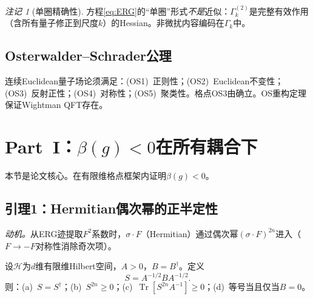 \documentclass[12pt,a4paper]{article}
\theoremstyle{plain}
\theoremstyle{definition}\newtheorem{definition}[theorem]{定义}
\theoremstyle{remark}\newtheorem{remark}[theorem]{注记}
\begin{document}
\begin{remark}[单圈精确性]\label{rem:oneloop}
方程\eqref{eq:ERG}的``单圈''形式\emph{不是}近似：$\Gamma_k^{(2)}$是完整有效作用（含所有量子修正到尺度$k$）的Hessian。非微扰内容编码在$\Gamma_k$中。
\end{remark}

\subsection{Osterwalder--Schrader公理}\label{sec:OSaxioms}

连续Euclidean量子场论须满足\cite{OsterwalderSchrader1973,OsterwalderSchrader1975}：(OS1)~正则性；(OS2)~Euclidean不变性；(OS3)~反射正性；(OS4)~对称性；(OS5)~聚类性。格点OS3由\cite{OsterwalderSeiler1978}确立。OS重构定理保证Wightman QFT存在。

\section{Part~I：$\beta(g)<0$在所有耦合下}\label{sec:betaneg}

本节是论文核心。在有限维格点框架内证明$\beta(g)<0$。

\subsection{引理1：Hermitian偶次幂的正半定性}\label{sec:lemma1}

\textit{动机。}从ERG迹提取$F^2$系数时，$\sigma\cdot F$（Hermitian）通过偶次幂$(\sigma\cdot F)^{2n}$进入（$F\to -F$对称性消除奇次项）。

\begin{lemma}[算子正定性]\label{lem:op}
设$\mathcal{H}$为$d$维有限维Hilbert空间，$A>0$，$B=B^\dagger$。定义
\begin{equation}\label{eq:Sdef}
S = A^{-1/2}BA^{-1/2}.
\end{equation}
则：(a)~$S=S^\dagger$；(b)~$S^{2n}\geq 0$；(c)~$\operatorname{Tr}[S^{2n}A^{-1}]\geq 0$；(d)~等号当且仅当$B=0$。
\end{lemma}
\end{document}

